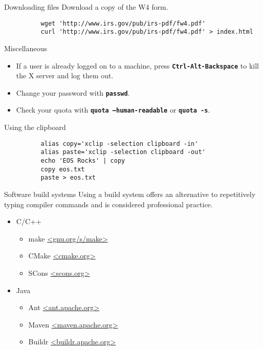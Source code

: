 \documentclass[8pt]{beamer}
\newcommand{\command}[1]{\textbf{\texttt{#1}}}
\begin{document}
\begin{frame}[fragile]{}
\begin{columns}
\begin{column}{0.33\textwidth}
      \begin{block}{Downloading files}
        Download a copy of the W4 form.
        \begin{verbatim}
          wget 'http://www.irs.gov/pub/irs-pdf/fw4.pdf'
          curl 'http://www.irs.gov/pub/irs-pdf/fw4.pdf' > index.html
        \end{verbatim}
      \end{block}
      \begin{block}{Miscellaneous}
        \begin{itemize}
        \item If a user is already logged on to a machine, press \command{Ctrl-Alt-Backspace} to kill the X server and log them out.
        \item Change your password with \command{passwd}.
        \item Check your quota with \command{quota --human-readable} or \command{quota -s}.
        \end{itemize}
      \end{block}
      \begin{block}{Using the clipboard}
        \begin{verbatim}
          alias copy='xclip -selection clipboard -in'
          alias paste='xclip -selection clipboard -out'
          echo 'EOS Rocks' | copy
          copy eos.txt
          paste > eos.txt
        \end{verbatim}
      \end{block}
      \begin{block}{Software build systems}
        Using a build system offers an alternative to repetitively typing compiler commands and is considered professional practice.
        \begin{itemize}
        \item C/C++
          \begin{itemize}
          \item make \url{<gnu.org/s/make>}
          \item CMake \url{<cmake.org>}
          \item SCons \url{<scons.org>}
          \end{itemize}
        \item Java
          \begin{itemize}
          \item Ant \url{<ant.apache.org>}
          \item Maven \url{<maven.apache.org>}
          \item Buildr \url{<buildr.apache.org>}
          \end{itemize}
        \end{itemize}
      \end{block}
    \end{column}
  \end{columns}
\end{frame}

\end{document}
